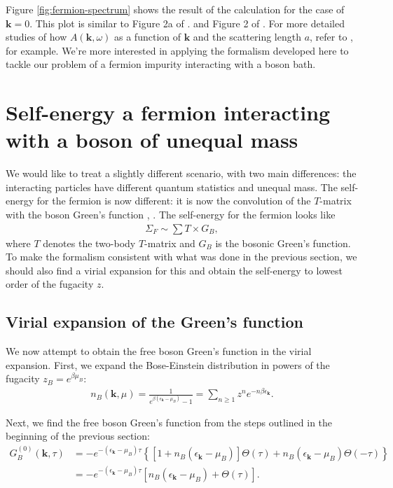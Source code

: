 \documentclass{article}
\theoremstyle{definition}
\begin{document}
\noindent Figure \ref{fig:fermion-spectrum} shows the result of the calculation for the case of $\mathbf{k} = 0$. This plot is similar to Figure 2a of \cite{sun2015high}.  and Figure 2 of \cite{nishida2013electron}. For more detailed studies of how $A(\mathbf{k}, \omega)$ as a function of $\mathbf{k}$ and the scattering length $a$, refer to \cite{sun2015high}, for example. We're more interested in applying the formalism developed here to tackle our problem of a fermion impurity interacting with a boson bath.



\section{Self-energy a fermion interacting with a boson of unequal mass}

We would like to treat a slightly different scenario, with two main differences: the interacting particles have different quantum statistics and unequal mass. The self-energy for the fermion is now different: it is now the convolution of the $T$-matrix with the boson Green's function \cite{kharga2017single}, \cite{manabe2019single}. The self-energy for the fermion looks like
\begin{align}
\Sigma_F\sim \sum T \times G_B,
\end{align}
where $T$ denotes the two-body $T$-matrix and $G_B$ is the bosonic Green's function. To make the formalism consistent with what was done in the previous section, we should also find a virial expansion for this and obtain the self-energy to lowest order of the fugacity $z$. 

\subsection{Virial expansion of the Green's function}
\noindent We now attempt to obtain the free boson Green's function in the virial expansion. First, we expand the Bose-Einstein distribution in powers of the fugacity $z_B = e^{\beta \mu_B}$:
\begin{align}
n_B(\mathbf{k},\mu) = \frac{1}{e^{\beta(\epsilon_\mathbf{k} - \mu_B)} - 1} = \sum_{n\geq 1} z^n e^{-n \beta \epsilon_\mathbf{k}}.
\end{align}

\noindent Next, we find the free boson Green's function from the steps outlined in the beginning of the previous section:
\begin{align}
G_B^{(0)}(\mathbf{k}, \tau) 
&=  -e^{-(\epsilon_\mathbf{k} - \mu_B)\tau} 
\left\{
    [1 + n_B(\epsilon_\mathbf{k} - \mu_B) ] \Theta(\tau) +  n_B(\epsilon_\mathbf{k} - \mu_B) \Theta(-\tau)
\right\} \\
&= -e^{-(\epsilon_\mathbf{k} - \mu_B) \tau} [n_B(\epsilon_\mathbf{k} - \mu_B)  + \Theta(\tau) ].
\end{align}
\end{document}

